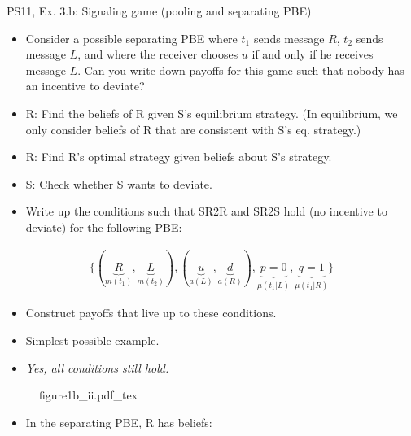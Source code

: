 \begin{frame}{PS11, Ex. 3.b: Signaling game (pooling and separating PBE)}
    \begin{itemize}
        \item[(b)] Consider a possible separating PBE where $t_1$ sends message $R$, $t_2$ sends message $L$, and where the receiver chooses $u$ if and only if he receives message $L$. Can you write down payoffs for this game such that nobody has an incentive to deviate?
    \end{itemize} \vspace{-8pt}
    \begin{multicols}{2}
      \begin{itemize}
        \item[SR3:] R: Find the beliefs of R given S's equilibrium strategy. (In equilibrium, we only consider beliefs of R that are consistent with S's eq. strategy.)
        \item[SR2R:] R: Find R's optimal strategy given beliefs about S's strategy.
        \item[SR2S:] S: Check whether S wants to deviate.
        \item[PBE:]  Write up the conditions such that SR2R and SR2S hold (no incentive to deviate) for the following PBE:
      \end{itemize}\vspace{-14pt}
      \begin{align*}
        \{(\underbrace{R}_{m(t_1)},\underbrace{L}_{m(t_2)}),(\underbrace{u}_{a(L)},\underbrace{d}_{a(R)}),\underbrace{p=0}_{\mu(t_1|L)},\underbrace{q=1}_{\mu(t_1|R)}\}
      \end{align*}\vspace{-12pt}
      \begin{itemize}
        \item[$\rightarrow$] Construct payoffs that live up to these conditions.
        \item[i:] Simplest possible example.
        \item[ii:] \textit{Yes, all conditions still hold.}
      \end{itemize}
      \vfill\null\columnbreak
      \begin{figure}[!h]
        \center
        \def\svgwidth{1.1\columnwidth}
        {figure1b_ii.pdf_tex}
      \end{figure} \vspace{-8pt}
      \begin{itemize}
        \item[SR3:] In the separating PBE, R has beliefs:\vspace{-10pt}

\end{itemize}
\end{multicols}
\end{frame}

